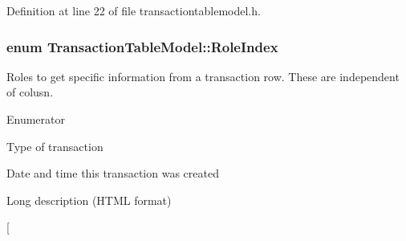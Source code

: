 Definition at line 22 of file transactiontablemodel.\+h.

\hypertarget{class_transaction_table_model_a4b248508c36df598476affbf9871d1e6}{}
\subsubsection[{Role\+Index}]{\setlength{\rightskip}{0pt plus 5cm}enum {\bf Transaction\+Table\+Model\+::\+Role\+Index}}\label{class_transaction_table_model_a4b248508c36df598476affbf9871d1e6}
Roles to get specific information from a transaction row. These are independent of colusn. \begin{Desc}
\item[Enumerator]\par
\begin{description}
\item[{\em 
\hypertarget{class_transaction_table_model_a4b248508c36df598476affbf9871d1e6a35c49f8c0732954b2812c67e4c745840}{}Type\+Role\label{class_transaction_table_model_a4b248508c36df598476affbf9871d1e6a35c49f8c0732954b2812c67e4c745840}
}]Type of transaction \item[{\em 
\hypertarget{class_transaction_table_model_a4b248508c36df598476affbf9871d1e6a46e879bd509162d980df3692c65eb66e}{}Date\+Role\label{class_transaction_table_model_a4b248508c36df598476affbf9871d1e6a46e879bd509162d980df3692c65eb66e}
}]Date and time this transaction was created \item[{\em 
\hypertarget{class_transaction_table_model_a4b248508c36df598476affbf9871d1e6a2957b8435634d7602e74b513d392d82c}{}Long\+Description\+Role\label{class_transaction_table_model_a4b248508c36df598476affbf9871d1e6a2957b8435634d7602e74b513d392d82c}
}]Long description (H\+T\+M\+L format) \item[{\em 
}
\end{description}
\end{Desc}

